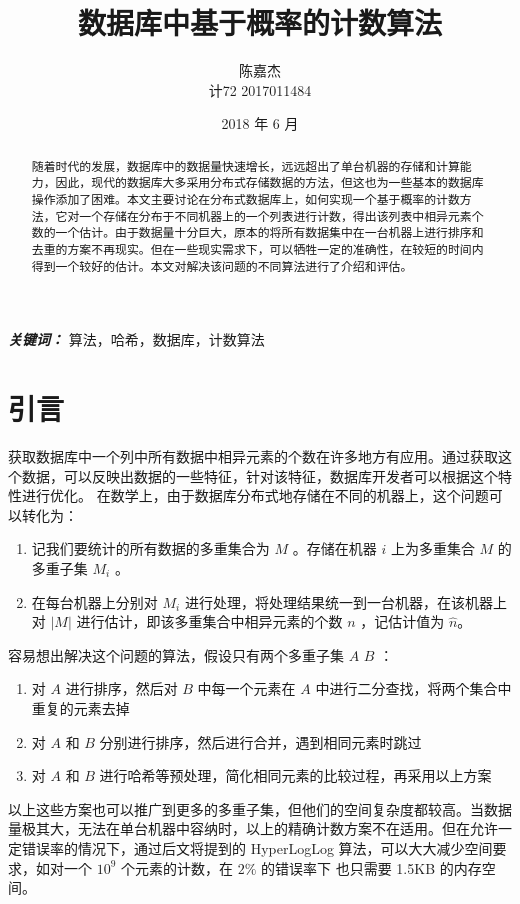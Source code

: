 \documentclass{ctexart}
\title{数据库中基于概率的计数算法}
\author{陈嘉杰 \\ 计72 2017011484}
\date{2018 年 6 月}
\begin{document}
\maketitle

\begin{abstract}
    随着时代的发展，数据库中的数据量快速增长，远远超出了单台机器的存储和计算能力，因此，现代的数据库大多采用分布式存储数据的方法，但这也为一些基本的数据库操作添加了困难。本文主要讨论在分布式数据库上，如何实现一个基于概率的计数方法，它对一个存储在分布于不同机器上的一个列表进行计数，得出该列表中相异元素个数的一个估计。由于数据量十分巨大，原本的将所有数据集中在一台机器上进行排序和去重的方案不再现实。但在一些现实需求下，可以牺牲一定的准确性，在较短的时间内得到一个较好的估计。本文对解决该问题的不同算法进行了介绍和评估。
\end{abstract}

\textbf{\textit{关键词： }} 算法，哈希，数据库，计数算法

\section{引言}
    获取数据库中一个列中所有数据中相异元素的个数在许多地方有应用。通过获取这个数据，可以反映出数据的一些特征，针对该特征，数据库开发者可以根据这个特性进行优化。\cite{Whang:1990ei} 在数学上，由于数据库分布式地存储在不同的机器上，这个问题可以转化为：
    \begin{enumerate}
        \item 记我们要统计的所有数据的多重集合为 $M$ 。存储在机器 $i$ 上为多重集合 $M$ 的多重子集 $M_i$ 。
        \item 在每台机器上分别对 $M_i$ 进行处理，将处理结果统一到一台机器，在该机器上对 $\left|M\right|$ 进行估计，即该多重集合中相异元素的个数 $n$ ，记估计值为 $\hat{n}$。
    \end{enumerate}

    容易想出解决这个问题的算法，假设只有两个多重子集 $A$ $B$ \cite{Whang:1990ei}：
    \begin{enumerate}
        \item 对 $A$ 进行排序，然后对 $B$ 中每一个元素在 $A$ 中进行二分查找，将两个集合中重复的元素去掉
        \item 对 $A$ 和 $B$ 分别进行排序，然后进行合并，遇到相同元素时跳过
        \item 对 $A$ 和 $B$ 进行哈希等预处理，简化相同元素的比较过程，再采用以上方案
    \end{enumerate}

    以上这些方案也可以推广到更多的多重子集，但他们的空间复杂度都较高。当数据量极其大，无法在单台机器中容纳时，以上的精确计数方案不在适用。但在允许一定错误率的情况下，通过后文将提到的 HyperLogLog 算法，可以大大减少空间要求，如对一个 $10^9$ 个元素的计数，在 $2\%$ 的错误率下 也只需要 1.5KB 的内存空间。\cite{Flajolet:2007um}
\end{document}
